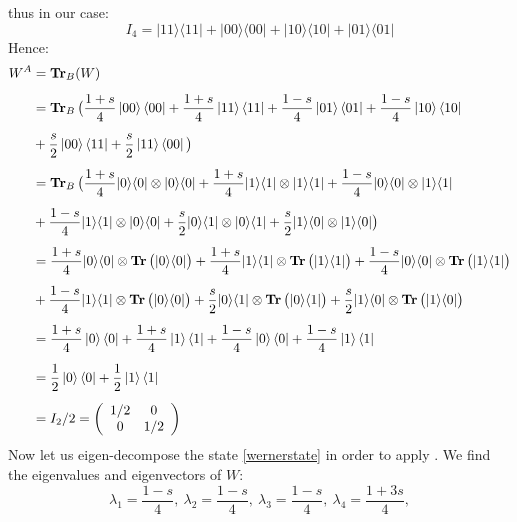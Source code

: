 thus in our case:
\begin{equation*}
I_{4}=|11\rangle \langle11|+|00\rangle \langle00|+|10\rangle \langle10|+|01\rangle \langle01|
\end{equation*}
Hence:
\begin{align}
W^A &= \operatorname{\textup{\textbf{Tr}}}_B (W) \nonumber \\[0.5em]
&= \operatorname{\textup{\textbf{Tr}}}_B \big(\frac{1+s}{4}\ket{00}\bra{00}+\frac{1+s}{4}\ket{11}\bra{11} +\frac{1-s}{4}\ket{01}\bra{01}+\frac{1-s}{4}\ket{10}\bra{10} \nonumber \\[0.5em]&+\frac{s}{2}\ket{00}\bra{11}+\frac{s}{2}\ket{11}\bra{00} \big) \nonumber \\[0.5em]
&= \operatorname{\textup{\textbf{Tr}}}_B \big(\frac{1+s}{4}|0\rangle \langle0|\otimes|0\rangle \langle0|+\frac{1+s}{4}|1\rangle \langle1|\otimes|1\rangle \langle1|  +\frac{1-s}{4}|0\rangle \langle0|\otimes|1\rangle \langle1| \nonumber \\[0.5em] &+\frac{1-s}{4}|1\rangle \langle 1|\otimes|0\rangle \langle0|+\frac{s}{2}|0\rangle \langle1|\otimes|0\rangle \langle1|+\frac{s}{2}|1\rangle \langle0|\otimes|1\rangle \langle0|
\big) \nonumber \\[0.5em]
&=\frac{1+s}{4}|0\rangle \langle0|\otimes \operatorname{\textup{\textbf{Tr}}} \big( |0\rangle \langle0| \big)+\frac{1+s}{4}|1\rangle \langle1|\otimes \operatorname{\textup{\textbf{Tr}}} \big( |1\rangle \langle1| \big)+\frac{1-s}{4}|0\rangle \langle0|\otimes \operatorname{\textup{\textbf{Tr}}} \big(|1\rangle \langle1|\big) \nonumber \\[0.5em] &+\frac{1-s}{4}|1\rangle \langle 1|\otimes \operatorname{\textup{\textbf{Tr}}} \big(|0\rangle \langle0| \big)+\frac{s}{2}|0\rangle \langle1|\otimes \operatorname{\textup{\textbf{Tr}}} \big( |0\rangle \langle1| \big)+\frac{s}{2}|1\rangle \langle0|\otimes \operatorname{\textup{\textbf{Tr}}} \big( |1\rangle \langle0|
\big) \nonumber \\[0.5em]
&= \frac{1+s}{4}\ket{0}\bra{0}+\frac{1+s}{4}\ket{1}\bra{1}+\frac{1-s}{4}\ket{0}\bra{0}+\frac{1-s}{4}\ket{1}\bra{1}
\nonumber \\[0.5em] &=
\frac{1}{2}\ket{0}\bra{0}+\frac{1}{2}\ket{1}\bra{1}
\nonumber \\[0.5em] &= I_{2}/2=
\left( \begin{array}{cccc}
 1/2 & 0  \\
 0 & 1/2 \\
\end{array}
\right)
\end{align}
Now let us eigen-decompose the state \eqref{wernerstate} in order to apply . We find the eigenvalues and eigenvectors of $W$:
\begin{equation}
\lambda_1=\frac{1-s}{4},\:  \lambda_2=\frac{1-s}{4},\:  \lambda_3=\frac{1-s}{4},\:  \lambda_4=\frac{1+3s}{4}, 
\end{equation}
